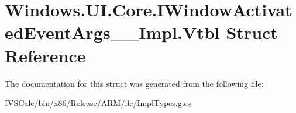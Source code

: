 \hypertarget{struct_windows_1_1_u_i_1_1_core_1_1_i_window_activated_event_args_____impl_1_1_vtbl}{}\section{Windows.\+U\+I.\+Core.\+I\+Window\+Activated\+Event\+Args\+\_\+\+\_\+\+Impl.\+Vtbl Struct Reference}
\label{struct_windows_1_1_u_i_1_1_core_1_1_i_window_activated_event_args_____impl_1_1_vtbl}


The documentation for this struct was generated from the following file\+:\begin{DoxyCompactItemize}
\item 
I\+V\+S\+Calc/bin/x86/\+Release/\+A\+R\+M/ilc/Impl\+Types.\+g.\+cs\end{DoxyCompactItemize}

